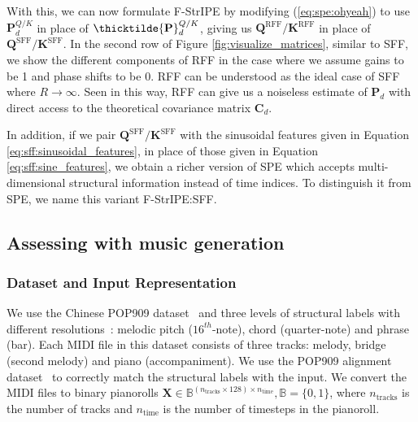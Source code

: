 With this, we can now formulate F-StrIPE by modifying (\ref{eq:spe:ohyeah}) to use $\mathbf{P}^{Q/K}_d$ in place of $\thicktilde{\mathbf{P}}^{Q/K}_d$, giving us $\mathbf{Q}^{\text{RFF}}/\mathbf{K}^{\text{RFF}}$ in place of $\mathbf{Q}^{\text{SFF}}/\mathbf{K}^{\text{SFF}}$. In the second row of Figure \ref{fig:visualize_matrices}, similar to SFF, we show the different components of RFF in the case where we assume gains to be 1 and phase shifts to be 0. RFF can be understood as the ideal case of SFF where $R \to \infty$. Seen in this way, RFF can give us a noiseless estimate of $\mathbf{P}_d$ with direct access to the theoretical covariance matrix $\mathbf{C}_d$.

In addition, if we pair $\mathbf{Q}^{\text{SFF}}/\mathbf{K}^{\text{SFF}}$ with the sinusoidal features given in Equation \ref{eq:sff:sinusoidal_features}, in place of those given in Equation \ref{eq:sff:sine_features}, we obtain a richer version of SPE which accepts multi-dimensional structural information instead of time indices. To distinguish it from SPE, we name this variant F-StrIPE:SFF.

\subsection{Assessing with music generation}

\subsubsection{Dataset and Input Representation} \label{sssection:data_input}
We use the Chinese POP909 dataset~\cite{wang_pop909_2020} and three levels of structural labels with different resolutions~\cite{dai_automatic_2020}: melodic pitch ($16^{th}$-note), chord (quarter-note) and phrase (bar). Each MIDI file in this dataset consists of three tracks: melody, bridge (second melody) and piano (accompaniment). 
We use the POP909 alignment dataset~\cite{agarwal_structure_2024} to correctly match the structural labels with the input. We convert the MIDI files to binary pianorolls $\mathbf{X} \in \mathbb{B}^{(n_\text{tracks} \times 128) \times n_\text{time}}, \mathbb{B} = \{0, 1\}$, where $n_\text{tracks}$ is the number of tracks and $n_\text{time}$ is the number of timesteps in the pianoroll.

